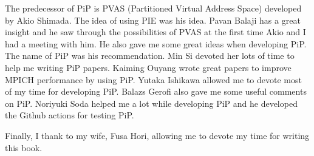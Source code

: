 
The predecessor of PiP is PVAS (Partitioned Virtual Address Space)
developed by Akio Shimada. The idea of using PIE was his idea. Pavan
Balaji has a great insight and he saw through the possibilities of
PVAS at the first time Akio and I had a meeting with him. He also gave
me some great ideas when developing PiP. The name of PiP was his
recommendation. Min Si devoted her lots of time to help me writing PiP
papers. Kaiming Ouyang wrote great papers to improve MPICH performance
by using 
PiP. Yutaka Ishikawa allowed me to devote most of my time for
developing PiP.  Balazs Gerofi also gave me some useful comments on
PiP. Noriyuki Soda helped me a lot while developing PiP and he developed
the Github actions for testing PiP.

Finally, I thank to my wife, Fusa Hori, allowing me to devote my time
for writing this book.
